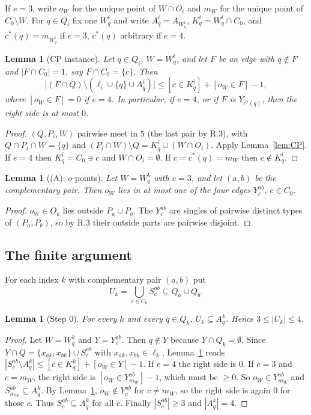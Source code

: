 \documentclass[11pt]{amsart}
\newtheorem{lemma}[theorem]{Lemma}
\theoremstyle{definition}
\begin{document}
If $e=3$, write $o_W$ for the unique point of $W\cap O_i$ and $m_W$ for the unique point of $C_0\setminus W$. For $q\in Q_i$ fix one $W^i_q$ and write $A^i_q=A_{W^i_q}$, $K^i_q=W^i_q\cap C_0$, and $c^*(q)=m_{W^i_q}$ if $e=3$, $c^*(q)$ arbitrary if $e=4$.

\begin{lemma}[CP instance]\label{lem:hit}
Let $q\in Q_i$, $W=W^i_q$, and let $F$ be an edge with $q\notin F$ and $|F\cap C_0|=1$, say $F\cap C_0=\{c\}$. Then
\[\bigl|(F\cap Q)\setminus(\ell_i\cup\{q\}\cup A^i_q)\bigr|\le [c\in K^i_q]+[o_W\in F]-1,\]
where $[o_W\in F]=0$ if $e=4$. In particular, if $e=4$, or if $F$ is $Y^{\cdot\cdot}_{c^*(q)}$, then the right side is at most $0$.
\end{lemma}
\begin{proof}
$(Q,P_i,W)$ pairwise meet in $5$ (the last pair by R.3), with $Q\cap P_i\cap W=\{q\}$ and $(P_i\cap W)\setminus Q=K^i_q\cup(W\cap O_i)$. Apply Lemma~\ref{lem:CP}. If $e=4$ then $K^i_q=C_0\ni c$ and $W\cap O_i=\emptyset$. If $c=c^*(q)=m_W$ then $c\notin K^i_q$.
\end{proof}

\begin{lemma}[(A): $o$-points]\label{lem:Aprop}
Let $W=W^k_q$ with $e=3$, and let $(a,b)$ be the complementary pair. Then $o_W$ lies in at most one of the four edges $Y^{ab}_c$, $c\in C_0$.
\end{lemma}
\begin{proof}
$o_W\in O_k$ lies outside $P_a\cup P_b$. The $Y^{ab}_c$ are singles of pairwise distinct types of $(P_a,P_b)$, so by R.3 their outside parts are pairwise disjoint.
\end{proof}

\subsection{The finite argument}
For each index $k$ with complementary pair $(a,b)$ put
\[U_k=\bigcup_{c\in C_0}S^{ab}_c\subseteq Q_a\cup Q_b .\]

\begin{lemma}[Step 0]\label{lem:step0}
For every $k$ and every $q\in Q_k$, $U_k\subseteq A^k_q$. Hence $3\le |U_k|\le 4$.
\end{lemma}
\begin{proof}
Let $W=W^k_q$ and $Y=Y^{ab}_c$. Then $q\notin Y$ because $Y\cap Q_k=\emptyset$. Since $Y\cap Q=\{x_{ak},x_{bk}\}\cup S^{ab}_c$ with $x_{ak},x_{bk}\in\ell_k$, Lemma~\ref{lem:hit} reads $|S^{ab}_c\setminus A^k_q|\le [c\in K^k_q]+[o_W\in Y]-1$. If $e=4$ the right side is $0$. If $e=3$ and $c=m_W$, the right side is $[o_W\in Y^{ab}_{m_W}]-1$, which must be $\ge 0$. So $o_W\in Y^{ab}_{m_W}$ and $S^{ab}_{m_W}\subseteq A^k_q$. By Lemma~\ref{lem:Aprop}, $o_W\notin Y^{ab}_c$ for $c\ne m_W$, so the right side is again $0$ for those $c$. Thus $S^{ab}_c\subseteq A^k_q$ for all $c$. Finally $|S^{ab}_c|\ge 3$ and $|A^k_q|=4$.
\end{proof}
\end{document}
